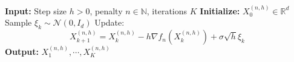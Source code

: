 \documentclass[amsfonts, reqno]{amsart}
\newtheorem{prop}[thm]{Proposition}
\theoremstyle{definition}
\theoremstyle{remark}
\newcommand{\bbR}{\mathbb{R}}
\newcommand{\bbN}{\mathbb{N}}
\numberwithin{equation}{section}
\begin{document}

\begin{algorithm}[H]
\caption{Penalized Constrained Unadjusted Langevin Algorithm (PCULA)}
\begin{algorithmic}[1]
\State \textbf{Input:} Step size $h > 0$, penalty $n \in \bbN$, iterations $K$
\State \textbf{Initialize:} $X_0^{(n,h)} \in \bbR^d$
    \State Sample $\xi_k \sim \mathcal{N}(0, I_d)$
    \State Update:
    \[
    X_{k+1}^{(n,h)} = X_k^{(n,h)} - h\nabla f_n\left(X_k^{(n,h)}\right) + \sigma\sqrt{h}\xi_k
    \]
\EndFor
\State \textbf{Output:} $X_1^{(n,h)}, \cdots, X_K^{(n,h)}$
\end{algorithmic}
\end{algorithm}
\end{document}
